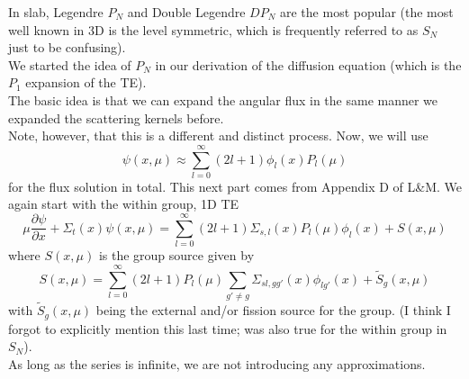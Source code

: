 \documentclass[12pt]{article}
\begin{document}
In slab, Legendre $P_N$ and Double Legendre $DP_N$ are the most popular (the most well known in 3D is the level symmetric, which is frequently referred to as $S_N$ just to be confusing). \\
We started the idea of $P_N$ in our derivation of the diffusion equation (which is the $P_1$ expansion of the TE). \\ 
The basic idea is that we can expand the angular flux in the same manner we expanded the scattering kernels before. \\
Note, however, that this is a different and distinct process. Now, we will use
\[
\psi(x, \mu) \approx \sum_{l=0}^{\infty} (2l+1)\phi_l(x)P_l(\mu)
\]
for the flux solution in total. This next part comes from Appendix D of L\&M. We again start with the within group, 1D TE
\[
\mu \frac{\partial \psi}{\partial x} + \Sigma_t(x)\psi(x,\mu) = \sum_{l=0}^{\infty} (2l+1) \Sigma_{s,l}(x) P_l(\mu)\phi_l(x) + S(x,\mu)
\]
where $S(x,\mu)$ is the group source given by
\[
S(x,\mu) = \sum_{l=0}^{\infty} (2l+1) P_l(\mu) \sum_{g' \neq g} \Sigma_{sl,gg'}(x) \phi_{lg'}(x) + \tilde{S}_g(x,\mu)
\]
with $\tilde{S}_g(x,\mu)$ being the external and/or fission source for the group. 
(I think I forgot to explicitly mention this last time; was also true for the within group in $S_N$).\\
As long as the series is infinite, we are not introducing any approximations.
\end{document}
